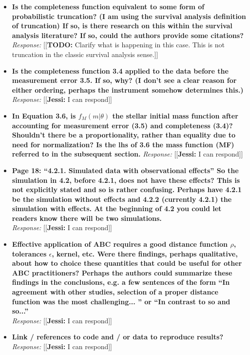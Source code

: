 \documentclass[11pt, oneside]{article}   	%
\newcommand{\jessi}[1]{{\color{blue}[[\textbf{Jessi: }#1]]}}
\newcommand{\todo}[1]{{\color{red}[[\textbf{TODO: }#1]]}}
\begin{document}
\begin{itemize}
\item {\bf Is the completeness function equivalent to some form of probabilistic truncation? (I am using the survival analysis definition of truncation) If so, is there research on this within the survival analysis literature? If so, could the authors provide some citations?} \\
\noindent \emph{Response:} \todo{Clarify what is happening in this case. This is not truncation in the classic survival analysis sense.}
\bigskip

\item {\bf Is the completeness function 3.4 applied to the data before the measurement error 3.5. If so, why? (I don't see a clear reason for either ordering, perhaps the instrument somehow determines this.)} \\
\noindent \emph{Response:} \jessi{I can respond}
\bigskip

\item {\bf In Equation 3.6, is $f_M (m|\theta)$ the stellar initial mass function after accounting for measurement error (3.5) and completeness (3.4)? Shouldn't there be a proportionality, rather than equality due to need for normalization? Is the lhs of 3.6 the mass function (MF) referred to in the subsequent section.}
\noindent \emph{Response:} \jessi{I can respond}
\bigskip

\item {\bf Page 18: ``4.2.1. Simulated data with observational effects'' So the simulation in 4.2, before 4.2.1, does not have these effects? This is not explicitly stated and so is rather confusing. Perhaps have 4.2.1 be the simulation without effects and 4.2.2 (currently 4.2.1) the simulation with effects. At the beginning of 4.2 you could let readers know there will be two simulations. }\\
\noindent \emph{Response:} \jessi{I can respond}
\bigskip

\item {\bf Effective application of ABC requires a good distance function $\rho$, tolerances $\epsilon$, kernel, etc. Were there findings, perhaps qualitative, about how to choice these quantities that could be useful for other ABC practitioners? Perhaps the authors could summarize these findings in the conclusions, e.g. a few sentences of the form ``In agreement with other studies, selection of a proper distance function was the most challenging... '' or ``In contrast to so and so...'' }\\
\noindent \emph{Response:} \jessi{I can respond}
\bigskip

\item {\bf Link / references to code and / or data to reproduce results?} \\
\noindent \emph{Response:} \jessi{I can respond}
\bigskip
\end{itemize}
\end{document}
